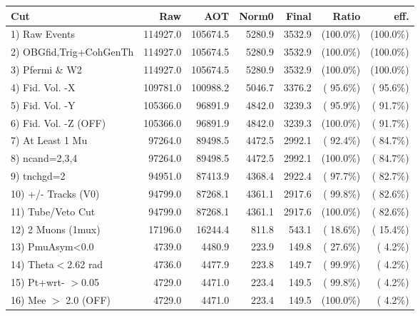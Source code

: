  \begin{table}[h!]\centering
 \begin{tabular}{||l||r|r|r|r|r|r||}
 \hline
 \hline
 Cut & Raw & AOT & Norm0 & Final & Ratio & eff.       \\
 \hline
  1) Raw Events           &     114927.0 &     105674.5 &       5280.9 &       3532.9 & (100.0\%) & (100.0\%) \\
  2) OBGfid,Trig+CohGenTh &     114927.0 &     105674.5 &       5280.9 &       3532.9 & (100.0\%) & (100.0\%) \\
  3) Pfermi \& W2         &     114927.0 &     105674.5 &       5280.9 &       3532.9 & (100.0\%) & (100.0\%) \\
  4) Fid. Vol. -X         &     109781.0 &     100988.2 &       5046.7 &       3376.2 & ( 95.6\%) & ( 95.6\%) \\
  5) Fid. Vol. -Y         &     105366.0 &      96891.9 &       4842.0 &       3239.3 & ( 95.9\%) & ( 91.7\%) \\
  6) Fid. Vol. -Z (OFF)   &     105366.0 &      96891.9 &       4842.0 &       3239.3 & (100.0\%) & ( 91.7\%) \\
  7) At Least 1 Mu        &      97264.0 &      89498.5 &       4472.5 &       2992.1 & ( 92.4\%) & ( 84.7\%) \\
  8) ncand=2,3,4          &      97264.0 &      89498.5 &       4472.5 &       2992.1 & (100.0\%) & ( 84.7\%) \\
  9) tnchgd=2             &      94951.0 &      87413.9 &       4368.4 &       2922.4 & ( 97.7\%) & ( 82.7\%) \\
 10) +/- Tracks (V0)      &      94799.0 &      87268.1 &       4361.1 &       2917.6 & ( 99.8\%) & ( 82.6\%) \\
 11) Tube/Veto Cut        &      94799.0 &      87268.1 &       4361.1 &       2917.6 & (100.0\%) & ( 82.6\%) \\
 12) 2 Muons (1mux)       &      17196.0 &      16244.4 &        811.8 &        543.1 & ( 18.6\%) & ( 15.4\%) \\
 13) PmuAsym<0.0          &       4739.0 &       4480.9 &        223.9 &        149.8 & ( 27.6\%) & (  4.2\%) \\
 14) Theta$<$2.62 rad     &       4736.0 &       4477.9 &        223.8 &        149.7 & ( 99.9\%) & (  4.2\%) \\
 15) Pt+wrt- $>$0.05      &       4729.0 &       4471.0 &        223.4 &        149.5 & ( 99.8\%) & (  4.2\%) \\
 16) Mee $>$ 2.0  (OFF)   &       4729.0 &       4471.0 &        223.4 &        149.5 & (100.0\%) & (  4.2\%) \\

\end{tabular}
\end{table}
